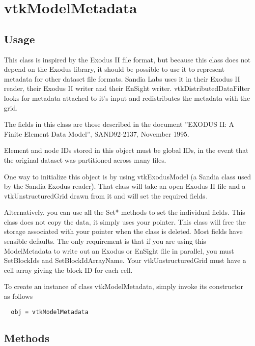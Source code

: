 \section{vtkModelMetadata}

\subsection{Usage}

   This class is inspired by the Exodus II file format, but
   because this class does not depend on the Exodus library, it 
   should be possible to use it to represent metadata for other 
   dataset file formats.  Sandia Labs uses it in their Exodus II
   reader, their Exodus II writer and their EnSight writer.
   vtkDistributedDataFilter looks for metadata attached to
   it's input and redistributes the metadata with the grid.
  
   The fields in this class are those described in the document
   ''EXODUS II: A Finite Element Data Model'', SAND92-2137, November 1995.

   Element and node IDs stored in this object must be global IDs,
   in the event that the original dataset was partitioned across
   many files.  

   One way to initialize this object is by using vtkExodusModel
   (a Sandia class used by the Sandia Exodus reader).
   That class will take an open Exodus II file and a
   vtkUnstructuredGrid drawn from it and will set the required fields.

   Alternatively, you can use all the Set*
   methods to set the individual fields. This class does not 
   copy the data, it simply uses your pointer. This 
   class will free the storage associated with your pointer 
   when the class is deleted.  Most fields have sensible defaults.
   The only requirement is that if you are using this ModelMetadata
   to write out an Exodus or EnSight file in parallel, you must 
   SetBlockIds and SetBlockIdArrayName.  Your vtkUnstructuredGrid must 
   have a cell array giving the block ID for each cell.


To create an instance of class vtkModelMetadata, simply
invoke its constructor as follows
\begin{verbatim}
  obj = vtkModelMetadata
\end{verbatim}
\subsection{Methods}


